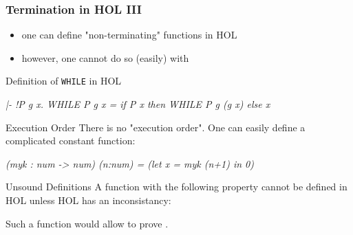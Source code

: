 \begin{frame}[fragile]
\frametitle{Termination in HOL III}
\begin{itemize}
\item one can define "non-terminating" functions in HOL
\item however, one cannot do so (easily) with 
\end{itemize}
\begin{exampleblock}{Definition of \texttt{WHILE} in HOL}
\begin{semiverbatim}\scriptsize
\emph{|- !P g x. WHILE P g x = if P x then WHILE P g (g x) else x}
\end{semiverbatim}
\end{exampleblock}


\begin{exampleblock}{Execution Order}\scriptsize
There is no "execution order". One can easily define a complicated constant function:
\vspace{-.7em}
\begin{semiverbatim}
\emph{(myk : num -> num) (n:num) = (let x = myk (n+1) in 0)}
\end{semiverbatim}
\end{exampleblock}

\begin{alertblock}{Unsound Definitions}\scriptsize
A function  with the following property cannot be defined in HOL unless HOL has an inconsistancy:
\begin{semiverbatim}
\end{semiverbatim}
Such a function would allow to prove .
\end{alertblock}

\end{frame}


